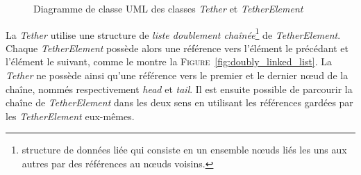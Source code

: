				\begin{figure}[!htb]
					\centering
					\caption{Diagramme de classe UML des classes \textit{Tether} et \textit{TetherElement}}
					\label{fig:uml_class}
				\end{figure}
				
				La \textit{Tether} utilise une structure de \textit{liste doublement chaînée}\footnote{structure de données liée qui consiste en un ensemble n\oe uds liés les uns aux autres par des références au n\oe uds voisins.} de \textit{TetherElement}. Chaque \textit{TetherElement} possède alors une référence vers l'élément le précédant et l'élément le suivant, comme le montre la \textsc{Figure}~\ref{fig:doubly_linked_list}. La \textit{Tether} ne possède ainsi qu'une référence vers le premier et le dernier n\oe ud de la chaîne, nommés respectivement \textit{head} et \textit{tail}. Il est ensuite possible de parcourir la chaîne de \textit{TetherElement} dans les deux sens en utilisant les références gardées par les \textit{TetherElement} eux-mêmes. 
			
